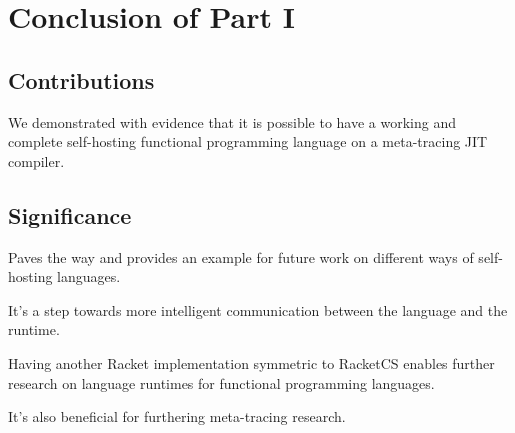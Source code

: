 \chapter{Conclusion of Part I}

	\section{Contributions}
		\begin{mainpoint}
			We demonstrated with evidence that it is possible to have a
			working and complete self-hosting functional programming language
			on a meta-tracing JIT compiler.
		\end{mainpoint}

	\section{Significance}
		\begin{mainpoint}
			Paves the way and provides an example for future work on
			different ways of self-hosting languages.

			It's a step towards more intelligent communication between
			the language and the runtime.

			Having another Racket implementation symmetric to RacketCS 
			enables further research on language runtimes for functional 
			programming languages.

			It's also beneficial for furthering meta-tracing research.
		\end{mainpoint}